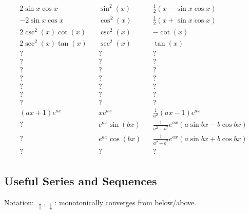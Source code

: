 \begin{align*}
2\sin x\cos x                            && \sin^2(x)                   && \frac{1}{2}(x - \sin x \cos x) \\
-2\sin x\cos x                           && \cos^2(x)                   && \frac{1}{2}(x + \sin x \cos x) \\
2\csc^2(x)\cot(x)                        && \csc^2(x)                   && -\cot(x) \\
2\sec^2(x)\tan(x)                        && \sec^2(x)                   && \tan(x) \\
?                                        && ?                           && ? \\
?                                        && ?                           && ? \\
?                                        && ?                           && ? \\
?                                        && ?                           && ? \\
?                                        && ?                           && ? \\
?                                        && ?                           && ? \\
?                                        && ?                           && ? \\
(ax+1)e^{ax}                             && xe^{ax}                     && \frac { 1 } { a ^ { 2 } } ( a x - 1 ) e ^ { a x } \\
?                                        && e^{ax}\sin(bx)              && \frac { 1 } { a ^ { 2 } + b ^ { 2 } } e ^ { a x } ( a \sin b x - b \cos b x ) \\
?                                        && e^{ax}\cos(bx)              && \frac { 1 } { a ^ { 2 } + b ^ { 2 } } e ^ { a x } ( a \sin b x + b \cos b x ) \\
?                                        && ?                           && ? \\
\end{align*}

\hypertarget{useful-series-and-sequences}{%
\subsection{Useful Series and
Sequences}\label{useful-series-and-sequences}}

Notation: \(\uparrow, \downarrow\): monotonically converges from
below/above.

